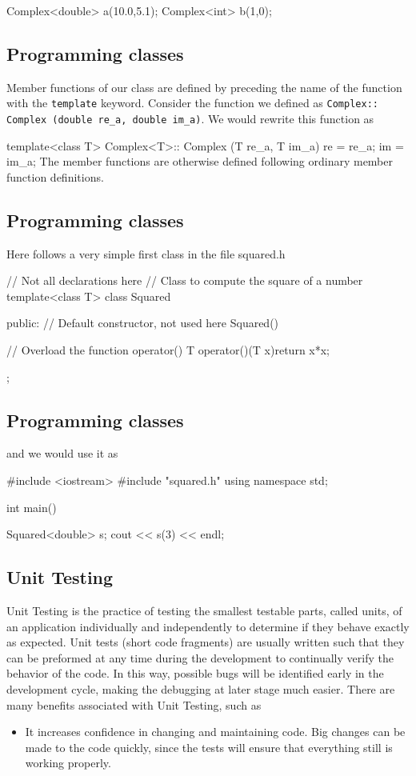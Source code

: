 \documentclass[%
oneside,                 %
final,                   %
10pt]{article}
\begin{document}
{{{{{{{{{\bcppcod
Complex<double> a(10.0,5.1);
Complex<int> b(1,0);
\ecppcod

\subsection{Programming classes}

Member functions of our class are defined by preceding the name of the function with the \Verb!template! keyword.
Consider the function we defined as \Verb!Complex:: Complex (double re_a, double im_a)!.
We would rewrite this function as

\bcppcod
template<class T>
Complex<T>:: Complex (T re_a, T im_a)
{ re = re_a; im = im_a; }
\ecppcod
The member functions  are otherwise defined following ordinary member function definitions.

\subsection{Programming classes}

Here follows a very simple first class in the file squared.h

\bcppcod
// Not all declarations here
// Class to compute the square of a number
template<class T>
class Squared{
  public:
    // Default constructor, not used here
    Squared(){}

    // Overload the function operator()
    T operator()(T x){return x*x;}

};
\ecppcod

\subsection{Programming classes}

and we would use it as

\bcppcod
#include <iostream>
#include "squared.h"
using namespace std;

int main(){
  Squared<double> s;
  cout << s(3) << endl;

\ecppcod


\subsection{Unit Testing}
\begin{block}{}
Unit Testing is the practice of testing the smallest testable parts,
called units, of an application individually and independently to
determine if they behave exactly as expected. Unit tests (short code
fragments) are usually written such that they can be preformed at any
time during the development to continually verify the behavior of the
code. In this way, possible bugs will be identified early in the
development cycle, making the debugging at later stage much
easier. There are many benefits associated with Unit Testing, such as
\begin{itemize}
  \item It increases confidence in changing and maintaining code. Big changes can be made to the code quickly, since the tests will ensure that everything still is working properly.


\end{itemize}
\end{block}}}}}}}}}}}
\end{document}
